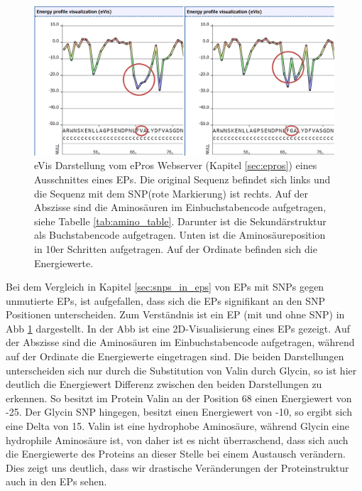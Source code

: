 \begin{figure}
    \centering
    \includegraphics[width=.99\textwidth]{images/ep_vs_snp.png}
    \caption{\ac{eVis} Darstellung vom ePros Webserver (Kapitel \ref{sec:epros}) eines Ausschnittes eines \ac{EP}s. Die original Sequenz befindet sich links und die Sequenz mit dem \ac{SNP}(rote Markierung) ist rechts. Auf der Abszisse sind die Aminosäuren im Einbuchstabencode aufgetragen, siehe Tabelle \ref{tab:amino_table}. Darunter ist die Sekundärstruktur als Buchstabencode aufgetragen. Unten ist die Aminosäureposition in 10er Schritten aufgetragen. Auf der Ordinate befinden sich die Energiewerte.}
    \label{fig:ep_vs_snp}
\end{figure}

Bei dem Vergleich in Kapitel \ref{sec:snps_in_eps} von \ac{EP}s mit \ac{SNP}s gegen unmutierte \ac{EP}s, ist aufgefallen, dass sich die \ac{EP}s signifikant an den \ac{SNP} Positionen unterscheiden. Zum Verständnis ist ein \ac{EP} (mit und ohne \ac{SNP}) in \ac{Abb} \ref{fig:ep_vs_snp} dargestellt. In der \ac{Abb} ist eine 2D-Visualisierung eines \ac{EP}s gezeigt. Auf der Abszisse sind die Aminosäuren im Einbuchstabencode aufgetragen, während auf der Ordinate die Energiewerte eingetragen sind. Die beiden Darstellungen unterscheiden sich nur durch die Substitution von Valin durch Glycin, so ist hier deutlich die Energiewert Differenz zwischen den beiden Darstellungen zu erkennen. So besitzt im Protein Valin an der Position 68 einen Energiewert von -25. Der Glycin \ac{SNP} hingegen, besitzt einen Energiewert von -10, so ergibt sich eine Delta von 15. Valin ist eine hydrophobe Aminosäure, während Glycin eine hydrophile Aminosäure ist, von daher ist es nicht überraschend, dass sich auch die Energiewerte des Proteins an dieser Stelle bei einem Austausch verändern. Dies zeigt uns deutlich, dass wir drastische Veränderungen der Proteinstruktur auch in den \ac{EP}s sehen.

